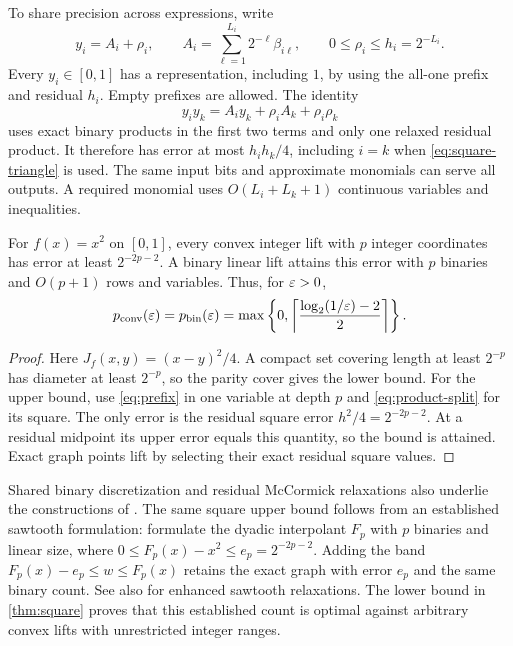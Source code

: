 To share precision across expressions, write
\begin{equation}\label{eq:prefix}
 y_i=A_i+\rho_i,\qquad
 A_i=\sum_{\ell=1}^{L_i}2^{-\ell}\beta_{i\ell},\qquad
 0\le\rho_i\le h_i=2^{-L_i}.
\end{equation}
Every $y_i\in[0,1]$ has a representation, including $1$, by using the
all-one prefix and residual $h_i$. Empty prefixes are allowed.
The identity
\begin{equation}\label{eq:product-split}
 y_i y_k=A_i y_k+\rho_i A_k+\rho_i\rho_k
\end{equation}
uses exact binary products in the first two terms and only one relaxed
residual product. It therefore has error at most $h_i h_k/4$, including
$i=k$ when \eqref{eq:square-triangle} is used. The same input bits and
approximate monomials can serve all outputs. A required monomial uses
$O(L_i+L_k+1)$ continuous variables and inequalities.

\begin{theorem}\label{thm:square}
For $f(x)=x^2$ on $[0,1]$, every convex integer lift with $p$ integer
coordinates has error at least $2^{-2p-2}$. A binary linear lift attains
this error with $p$ binaries and $O(p+1)$ rows and variables. Thus, for
$\varepsilon>0$,
\[
 p_{\mathrm{conv}}(\varepsilon)=p_{\mathrm{bin}}(\varepsilon)
 =\max\left\{0,\left\lceil\frac{\log_2(1/\varepsilon)-2}{2}\right\rceil\right\}.
\]
\end{theorem}
\begin{proof}
Here $J_f(x,y)=(x-y)^2/4$. A compact set covering length at least
$2^{-p}$ has diameter at least $2^{-p}$, so the parity cover gives the
lower bound. For the upper bound, use \eqref{eq:prefix} in one variable
at depth $p$ and \eqref{eq:product-split} for its square. The only error
is the residual square error $h^2/4=2^{-2p-2}$. At a residual midpoint
its upper error equals this quantity, so the bound is attained. Exact
graph points lift by selecting their exact residual square values.
\end{proof}

Shared binary discretization and residual McCormick relaxations also
underlie the constructions of \citet{beach2024b}. The same square upper
bound follows from an established sawtooth formulation: \citet[Section 2.1 and Proposition 1]{beach2022}
formulate the dyadic interpolant $F_p$ with $p$ binaries and linear size,
where $0\le F_p(x)-x^2\le e_p=2^{-2p-2}$. Adding the band
$F_p(x)-e_p\le w\le F_p(x)$ retains the exact graph with error $e_p$
and the same binary count. See also \citet{beach2024} for enhanced
sawtooth relaxations. The lower bound in \cref{thm:square} proves that
this established count is optimal against arbitrary convex lifts with
unrestricted integer ranges.

